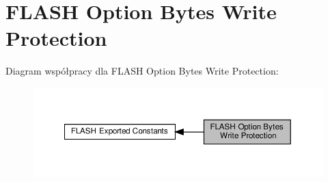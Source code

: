 \hypertarget{group___f_l_a_s_h_ex___option___bytes___write___protection}{}\section{F\+L\+A\+SH Option Bytes Write Protection}
\label{group___f_l_a_s_h_ex___option___bytes___write___protection}
Diagram współpracy dla F\+L\+A\+SH Option Bytes Write Protection\+:\nopagebreak
\begin{figure}[H]
\begin{center}
\leavevmode
\includegraphics[width=350pt]{group___f_l_a_s_h_ex___option___bytes___write___protection}
\end{center}
\end{figure}
